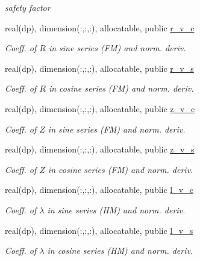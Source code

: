 \begin{DoxyCompactItemize}
\begin{DoxyCompactList}\small\item\em safety factor \end{DoxyCompactList}\item 
real(dp), dimension(\+:,\+:,\+:), allocatable, public \hyperlink{namespacevmec__vars_a8307a4a411dadf5b9be24f8aafac5f39}{r\+\_\+v\+\_\+c}
\begin{DoxyCompactList}\small\item\em Coeff. of $R$ in sine series (FM) and norm. deriv. \end{DoxyCompactList}\item 
real(dp), dimension(\+:,\+:,\+:), allocatable, public \hyperlink{namespacevmec__vars_ac6cdafd632e37856533c42e8ab34a680}{r\+\_\+v\+\_\+s}
\begin{DoxyCompactList}\small\item\em Coeff. of $R$ in cosine series (FM) and norm. deriv. \end{DoxyCompactList}\item 
real(dp), dimension(\+:,\+:,\+:), allocatable, public \hyperlink{namespacevmec__vars_a66130a0eb0bc39ae0294f008f283efcd}{z\+\_\+v\+\_\+c}
\begin{DoxyCompactList}\small\item\em Coeff. of $Z$ in sine series (FM) and norm. deriv. \end{DoxyCompactList}\item 
real(dp), dimension(\+:,\+:,\+:), allocatable, public \hyperlink{namespacevmec__vars_ac6a5f1ccefd4c0337189c09166558bb1}{z\+\_\+v\+\_\+s}
\begin{DoxyCompactList}\small\item\em Coeff. of $Z$ in cosine series (FM) and norm. deriv. \end{DoxyCompactList}\item 
real(dp), dimension(\+:,\+:,\+:), allocatable, public \hyperlink{namespacevmec__vars_acf90dcedfaae39a8a6778fbf75a90a40}{l\+\_\+v\+\_\+c}
\begin{DoxyCompactList}\small\item\em Coeff. of $\lambda$ in sine series (HM) and norm. deriv. \end{DoxyCompactList}\item 
real(dp), dimension(\+:,\+:,\+:), allocatable, public \hyperlink{namespacevmec__vars_a5d1de7879021fa8c1d8c10bbef01f9c7}{l\+\_\+v\+\_\+s}
\begin{DoxyCompactList}\small\item\em Coeff. of $\lambda$ in cosine series (HM) and norm. deriv. \end{DoxyCompactList}\item 

\end{DoxyCompactItemize}
